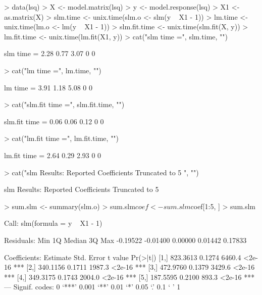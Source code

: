 \documentclass{article}
\begin{document}
\begin{Schunk}
\begin{Sinput}
> data(lsq)
> X <- model.matrix(lsq)
> y <- model.response(lsq)
> X1 <- as.matrix(X)
> slm.time <- unix.time(slm.o <- slm(y ~ X1 - 1))
> lm.time <- unix.time(lm.o <- lm(y ~ X1 - 1))
> slm.fit.time <- unix.time(slm.fit(X, y))
> lm.fit.time <- unix.time(lm.fit(X1, y))
> cat("slm time =", slm.time, "\n")
\end{Sinput}
\begin{Soutput}
slm time = 2.28 0.77 3.07 0 0 
\end{Soutput}
\begin{Sinput}
> cat("lm time =", lm.time, "\n")
\end{Sinput}
\begin{Soutput}
lm time = 3.91 1.18 5.08 0 0 
\end{Soutput}
\begin{Sinput}
> cat("slm.fit time =", slm.fit.time, "\n")
\end{Sinput}
\begin{Soutput}
slm.fit time = 0.06 0.06 0.12 0 0 
\end{Soutput}
\begin{Sinput}
> cat("lm.fit time =", lm.fit.time, "\n")
\end{Sinput}
\begin{Soutput}
lm.fit time = 2.64 0.29 2.93 0 0 
\end{Soutput}
\begin{Sinput}
> cat("slm Results: Reported Coefficients Truncated to 5  ", "\n")
\end{Sinput}
\begin{Soutput}
slm Results: Reported Coefficients Truncated to 5   
\end{Soutput}
\begin{Sinput}
> sum.slm <- summary(slm.o)
> sum.slm$coef <- sum.slm$coef[1:5, ]
> sum.slm
\end{Sinput}
\begin{Soutput}
Call:
slm(formula = y ~ X1 - 1)

Residuals:
     Min       1Q   Median       3Q      Max 
-0.19522 -0.01400  0.00000  0.01442  0.17833 

Coefficients:
     Estimate Std. Error t value Pr(>|t|)    
[1,] 823.3613     0.1274  6460.4   <2e-16 ***
[2,] 340.1156     0.1711  1987.3   <2e-16 ***
[3,] 472.9760     0.1379  3429.6   <2e-16 ***
[4,] 349.3175     0.1743  2004.0   <2e-16 ***
[5,] 187.5595     0.2100   893.3   <2e-16 ***
---
Signif. codes:  0 `***' 0.001 `**' 0.01 `*' 0.05 `.' 0.1 ` ' 1 


\end{Soutput}
\end{Schunk}
\end{document}
